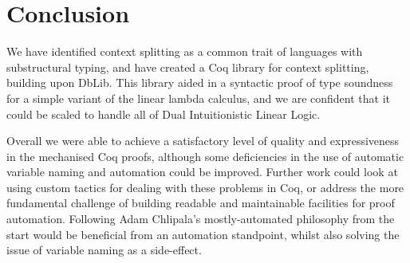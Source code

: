 \documentclass[]{unswthesis}
\begin{document}








\chapter{Conclusion}

We have identified context splitting as a common trait of languages with substructural typing, and have created a Coq library for context splitting, building upon DbLib. This library aided in a syntactic proof of type soundness for a simple variant of the linear lambda calculus, and we are confident that it could be scaled to handle all of Dual Intuitionistic Linear Logic.

Overall we were able to achieve a satisfactory level of quality and expressiveness in the mechanised Coq proofs, although some deficiencies in the use of automatic variable naming and automation could be improved. Further work could look at using custom tactics for dealing with these problems in Coq, or address the more fundamental challenge of building readable and maintainable facilities for proof automation. Following Adam Chlipala's mostly-automated philosophy from the start would be beneficial from an automation standpoint, whilst also solving the issue of variable naming as a side-effect.
\end{document}
